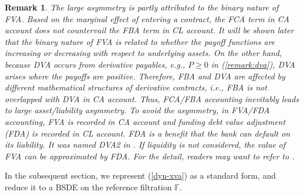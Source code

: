 \documentclass[a4paper, 11pt]{article}              %
\numberwithin{equation}{section}
\theoremstyle{plain}
\newcommand{\1}{\mathds{1}}
\newcommand{\dsF}{\mathbb{F}}
\theoremstyle{plain}
\theoremstyle{definition}
\newtheorem{remark}[thm]{Remark} %
\theoremstyle{plain}
\newtheorem{remark}{Remark}
\begin{document}
\begin{remark}
  The large asymmetry is partly attributed to the binary nature of
  FVA. Based on the marginal effect of entering a contract, the FCA term in CA
  account does not countervail the FBA term in CL account. It will be shown later
  that the binary nature of FVA is related to whether the payoff functions are
  increasing or decreasing with respect to underlying assets. On the other hand,
  because DVA occurs from derivative payables, e.g., $P \geq0$ in
  (\ref{remark:dva}), DVA arises where the payoffs are positive. Therefore, FBA
  and DVA are affected by different mathematical structures of derivative
  contracts, i.e., FBA is not overlapped with DVA in CA account. Thus, FCA/FBA
  accounting inevitably leads to large asset/liability asymmetry. To avoid the
  asymmetry, in FVA/FDA accounting, FVA is recorded in CA account and
  \textit{funding debt value adjustment} (FDA) is recorded in CL account. FDA is
  a benefit that the bank can default on its liability. It was named DVA2 in
  \cite{hull2012fva}. If liquidity is not considered, the value of FVA can be
  approximated by FDA.  For the detail, readers may want to refer to
  \cite{albanese2014accounting}.   
\end{remark}
\fi
In the subsequent section, we represent (\ref{dyn-xva}) as a standard form, and reduce
it to a BSDE on the reference filtration $\dsF$. 
\end{document}
